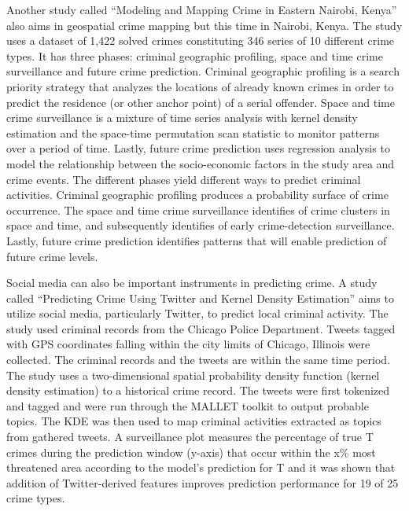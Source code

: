     Another study called “Modeling and Mapping Crime in Eastern Nairobi, Kenya” \citep{mburu2014modeling} also aims in geospatial crime mapping but this time in Nairobi, Kenya. The study uses a dataset of 1,422 solved crimes constituting 346 series of 10 different crime types. It has three phases: criminal geographic profiling, space and time crime surveillance and future crime prediction. Criminal geographic profiling is a search priority strategy that analyzes the locations of already known crimes in order to predict the residence (or other anchor point) of a serial offender. Space and time crime surveillance is a mixture of time series analysis with kernel density estimation and the space-time permutation scan statistic to monitor patterns over a period of time. Lastly, future crime prediction uses regression analysis to model the relationship between the socio-economic factors in the study area and crime events. The different phases yield different ways to predict criminal activities. Criminal geographic profiling produces a probability surface of crime occurrence. The space and time crime surveillance identifies of crime clusters in space and time, and subsequently identifies of early crime-detection surveillance. Lastly, future crime prediction identifies patterns that will enable prediction of future crime levels.

    Social media can also be important instruments in predicting crime. A study called “Predicting Crime Using Twitter and Kernel Density Estimation” \citep{gerber2014predicting} aims to utilize social media, particularly Twitter, to predict local criminal activity. The study used criminal records from the Chicago Police Department. Tweets tagged with GPS coordinates falling within the city limits of Chicago, Illinois were collected. The criminal records and the tweets are within the same time period. The study uses a two-dimensional spatial probability density function (kernel density estimation) to a historical crime record. The tweets were first tokenized and tagged and were run through the MALLET toolkit to output probable topics. The KDE was then used to map criminal activities extracted as topics from gathered tweets. A surveillance plot measures the percentage of true T crimes during the prediction window (y-axis) that occur within the x\% most threatened area according to the model's prediction for T and it was shown that addition of Twitter-derived features improves prediction performance for 19 of 25 crime types.

